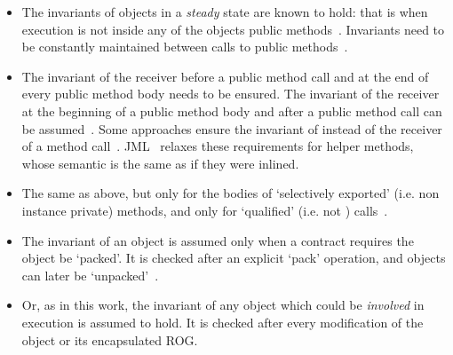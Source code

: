 \begin{itemize}
\item The invariants of objects in a \textit{steady} state are known to hold: that is when execution is not inside any of the objects public methods~\cite{Gopinathan:2008:RMO:1483018.1483028}. Invariants need to be constantly maintained between calls to public methods~\cite{WikiInvariant}.
\item 
The invariant of the receiver before a public method call and at the end of every public method body needs to be ensured. The invariant of the receiver at the beginning of a public method body and after a public method call can be assumed~\cite{Burdy2005,drossopoulou2008unified}.  
Some approaches ensure the invariant of \Q@this@ instead of the receiver of a method call~\cite{DBLP:journals/scp/MullerPL06}.
JML~\cite{JML} relaxes these requirements for helper methods, whose semantic is the same as if they were inlined.


\item The same as above, but only for the bodies of `selectively exported' (i.e. non instance private) methods, and only for `qualified' (i.e. not \Q@this@) calls~\cite{meyer2016class}.
\item The invariant of an object is assumed only when a contract requires the object be `packed'. It is checked after an explicit `pack' operation, and objects can later be `unpacked'~\cite{DBLP:journals/jot/BarnettDFLS04}.
\item Or, as in this work, the invariant of any object which could be \emph{involved} in execution is assumed to hold. It is checked after every modification of the object or its encapsulated ROG.
\end{itemize}

